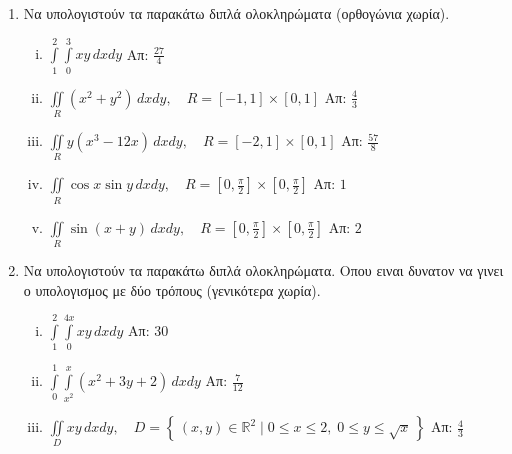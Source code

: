 



\everymath{\displaystyle}




\begin{center}
\end{center}

\vspace{\baselineskip}

\begin{enumerate}

\item Να υπολογιστούν τα παρακάτω διπλά ολοκληρώματα (ορθογώνια χωρία).

\begin{enumerate}[i)]

\item $\int\limits_1^2\!\!\!\int\limits_0^ 3xy\,dxdy$ \hfill Απ: $\frac{27}{4}$

\item $\iint\limits_{R}(x^2+y^2)\,dxdy,\quad R=[-1,1]\times[0,1]$ \hfill Απ: $\frac{4}{3}$

\item $\iint\limits_{R}y(x^3-12x)\,dxdy,\quad R=[-2,1]\times[0,1]$ \hfill Απ: $\frac{57}{8}$

\item $\iint\limits_{R}\cos x\sin y\,dxdy,\quad R=[0,\frac{\pi}{2}]\times[0,\frac{\pi}{2}]$ \hfill Απ: $1$

\item $\iint\limits_{R}\sin(x+y)\,dxdy, \quad R=[0,\frac{\pi}{2}]\times[0,\frac{\pi}{2}]$ \hfill Απ: $2$
\end{enumerate}

\vspace{\baselineskip}

\item Να υπολογιστούν τα παρακάτω διπλά ολοκληρώματα. Οπου ειναι δυνατον να γινει ο υπολογισμος με δύο τρόπους (γενικότερα χωρία).

\begin{enumerate}[i)]

\item $\int\limits_1^2\!\!\int\limits_0^{4x} xy\,dxdy$ \hfill Απ: $30$

\item $\int\limits_0^1\!\!\int\limits_{x^2}^{x}(x^2+3y+2)\,dxdy$ \hfill Απ: $\frac{7}{12}$

\item $\iint\limits_{D}xy\,dxdy,\quad D=\left\{\,(x,y)\in\mathbb{R}^2\mid 0\leq x\leq 2,\; 0\leq y\leq \sqrt{x}\,\right\}$ \hfill Απ: $\frac{4}{3}$


\end{enumerate}
\end{enumerate}
